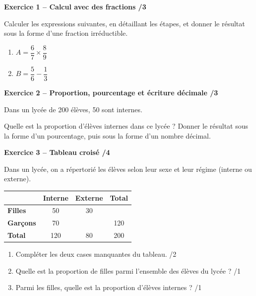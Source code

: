 \documentclass[10pt,a4paper]{article}
\begin{document}


\textbf{Exercice 1 -- Calcul avec des fractions \hfill /3}

Calculer les expressions suivantes, en détaillant les étapes, et donner le résultat sous la forme d'une fraction irréductible.

\begin{enumerate}
\item \(A = \dfrac{6}{7}\times\dfrac{8}{9}\)

\vspace{2.5cm}

\item \(B = \dfrac{5}{6}-\dfrac{1}{3}\)

\vspace{2.5cm}
\end{enumerate}

\textbf{Exercice 2 -- Proportion, pourcentage et écriture décimale \hfill /3}

Dans un lycée de 200 élèves, 50 sont internes.

Quelle est la proportion d'élèves internes dans ce lycée ? Donner le résultat sous la forme d'un pourcentage, puis sous la forme d'un nombre décimal.

\vspace{3cm}

\textbf{Exercice 3 -- Tableau croisé \hfill /4}

Dans un lycée, on a répertorié les élèves selon leur sexe et leur régime (interne ou externe).

\begin{center}
\renewcommand{\arraystretch}{1.5}
\begin{tabular}{|l|c|c|c|}
\hline
 & \textbf{Interne} & \textbf{Externe} & \textbf{Total} \\
\hline
\textbf{Filles} & 50 & 30 & \\
\hline
\textbf{Garçons} & 70 & & 120 \\
\hline
\textbf{Total} & 120 & 80 & 200 \\
\hline
\end{tabular}
\end{center}

\begin{enumerate}
\item Compléter les deux cases manquantes du tableau. \hfill /2

\vspace{1.5cm}

\item Quelle est la proportion de filles parmi l'ensemble des élèves du lycée ? \hfill /1

\vspace{1.5cm}

\item Parmi les filles, quelle est la proportion d'élèves internes ? \hfill /1
\end{enumerate}
\end{document}
